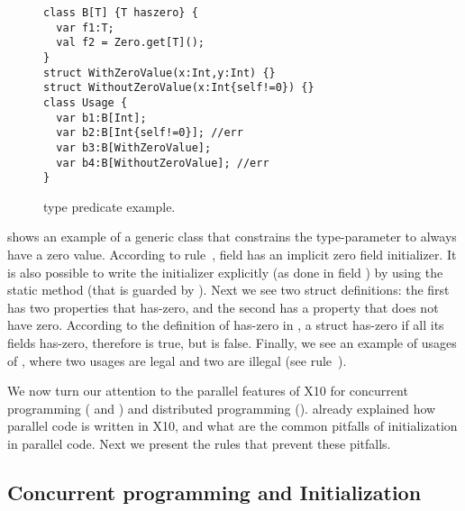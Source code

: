 \begin{figure}
\vspace{-0.2cm}\begin{lstlisting}
class B[T] {T haszero} {
  var f1:T;
  val f2 = Zero.get[T]();
}
struct WithZeroValue(x:Int,y:Int) {}
struct WithoutZeroValue(x:Int{self!=0}) {}
class Usage {
  var b1:B[Int];
  var b2:B[Int{self!=0}]; //err
  var b3:B[WithZeroValue];
  var b4:B[WithoutZeroValue]; //err
}
\end{lstlisting}\vspace{-0.2cm}
    \caption{ type predicate example.
    }
\label{Figure:Generics}
\end{figure}



 shows an example of a generic class 
    that constrains the type-parameter  to always have a zero value.
According to rule~, field  has an implicit zero field initializer.
It is also possible to write the initializer explicitly (as done in field ) by using the static method 
    (that is guarded by ).
Next we see two struct definitions:
    the first has two properties that has-zero,
    and the second has a property that does not have zero.
According to the definition of has-zero in ,
    a struct has-zero if all its fields has-zero,
    therefore  is true, but
     is false.
Finally, we see an example of usages of ,
    where two usages are legal and two are illegal
    (see rule~).







We now turn our attention to the parallel features of X10 for
    concurrent programming ( and )
    and distributed programming ().
 already explained how parallel code is written in X10,
    and what are the common pitfalls of initialization in parallel code.
Next we present the rules that prevent these pitfalls.

\subsection{Concurrent programming and Initialization}


